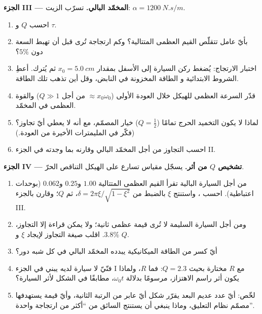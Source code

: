 \begin{problem}
\medskip
\noindent\textbf{الجزء III --- المخمّد البالي.}
تسرّب الزيت: $\alpha = \qty{1200}{N.s/m}$.
\begin{enumerate}[resume]
  \item احسب $Q$  و $\tau$.
  \item بأيّ عامل تتقلّص القيم العظمى المتتالية؟ وكم ارتجاجة
        تُرى قبل أن تهبط السعة دون $5\%$؟
  \item اختبار الارتجاج: يُضغط ركن السيارة إلى الأسفل بمقدار $x_0 =
        \qty{5.0}{cm}$ ثم يُترك. أعطِ الشروط الابتدائية و
        الطاقة المخزونة في النابض، وقل أين تذهب تلك الطاقة.
  \item قدّر السرعة العظمى للهيكل خلال العودة
        الأولى ($\approx x_0\omega_0$ من أجل $Q \gg 1$) والقوة العظمى
        في المخمّد.
  \item لماذا لا يكون التخميد الحرج تمامًا ($Q = \tfrac12$) خيار
        المصمّم، مع أنه لا يعطي أيّ تجاوز؟ (فكّر في
        المليمترات الأخيرة من العودة.)
  \item احسب التجاوز من أجل المخمّد البالي وقارنه بما
        وجدته في الجزء II.
\end{enumerate}

\medskip
\noindent\textbf{الجزء IV --- تشخيص $Q$ من أثر.}
يسجّل مقياس تسارع على الهيكل التناقص الحرّ.
\begin{enumerate}[resume]
  \item من أجل السيارة البالية تقرأ القيم العظمى المتتالية $1.00$ و$0.25$ و$0.062$
        (بوحدات اعتباطية). احسب ، واستنتج
        $\xi$ بالضبط من $\delta = 2\pi\xi/\sqrt{1 - \xi^2}$، ثم $Q$؛
        وقارن بالجزء III.
  \item ومن أجل السيارة السليمة لا تُرى قيمة عظمى ثانية؛ ولا يمكن قراءة إلا
        التجاوز، $3.8\%$. اقلب صيغة التجاوز لإيجاد
        $\xi$ و $Q$.
  \item أيّ كسر من الطاقة الميكانيكية يبدده المخمّد البالي
        في كل شبه دور؟
  \item فنّيّ لا سيارة لديه يبني  في الجزء I
        مع $R$ مختارة بحيث $Q = 2.3$: فما $R$، ولماذا يكون أثر
        راسم الاهتزاز، مرسومًا بدلالة $\omega_0 t$، مطابقًا في
        الشكل لأثر السيارة؟
  \item لخّص: أيّ عدد عديم البعد يقرّر شكل أيّ
        عابر من الرتبة الثانية، وأيّ قيمة يستهدفها مصمّم نظام التعليق،
        وماذا ينبغي أن يستنتج السائق من ``أكثر من ارتجاجة
        واحدة''.
\end{enumerate}
\end{problem}
